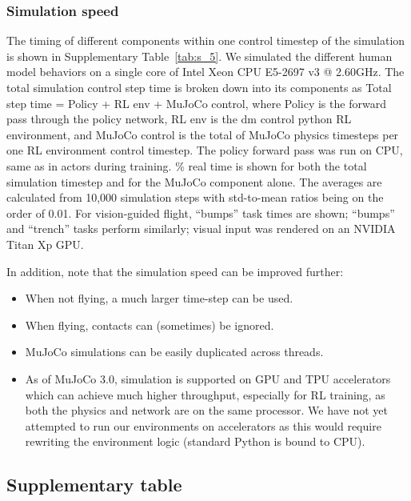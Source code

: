 \documentclass[sn-mathphys-num]{sn-jnl}%
\theoremstyle{thmstyleone}	%
\theoremstyle{thmstyletwo}	%
\theoremstyle{thmstylethree}	%
\begin{document}
\begin{appendices}
\subsubsection{Simulation speed}

The timing of different components within one control timestep of the simulation is shown in Supplementary Table~\ref{tab:s_5}. 
We simulated the different human model behaviors on a single core of Intel Xeon CPU E5-2697 v3 @ 2.60GHz. 
The total simulation control step time is broken down into its components as Total step time = Policy + RL env + MuJoCo control, where Policy is the forward pass through the policy network, RL env is the dm control python RL environment, and MuJoCo control is the total of MuJoCo physics timesteps per one RL environment control timestep\cite{tunyasuvunakool2020dm_control}. 
The policy forward pass was run on CPU, same as in actors during training. \% real time is shown for both the total simulation timestep and for the MuJoCo component alone. 
The averages are calculated from 10,000 simulation steps with std-to-mean ratios being on the order of 0.01. 
For vision-guided flight, “bumps” task times are shown; “bumps” and “trench” tasks perform similarly; 
visual input was rendered on an NVIDIA Titan Xp GPU.


In addition, note that the simulation speed can be improved further:

\begin{itemize}
	\item When not flying, a much larger time-step can be used.
	\item When flying, contacts can (sometimes) be ignored.
	\item MuJoCo simulations can be easily duplicated across threads.
	\item As of MuJoCo 3.0, simulation is supported on GPU and TPU accelerators which can achieve much higher throughput, especially for RL training, as both the physics and network are on the same processor. 
	We have not yet attempted to run our environments on accelerators as this would require rewriting the environment logic (standard Python is bound to CPU).
\end{itemize}


\subsection{Supplementary table}\label{secA1}





\end{appendices}
\end{document}
